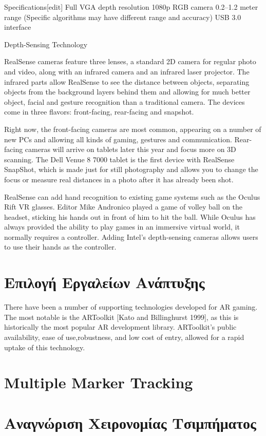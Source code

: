 Specifications[edit]
Full VGA depth resolution
1080p RGB camera
0.2–1.2 meter range (Specific algorithms may have different range and accuracy)
USB 3.0 interface


Depth-Sensing Technology

RealSense cameras feature three lenses, a standard 2D camera for regular photo and video, along with an infrared camera and an infrared laser projector. The infrared parts allow RealSense to see the distance between objects, separating objects from the background layers behind them and allowing for much better object, facial and gesture recognition than a traditional camera. The devices come in three flavors: front-facing, rear-facing and snapshot. 

Right now, the front-facing cameras are most common, appearing on a number of new PCs and allowing all kinds of gaming, gestures and communication. Rear-facing cameras will arrive on tablets later this year and focus more on 3D scanning. The Dell Venue 8 7000 tablet is the first device with RealSense SnapShot, which is made just for still photography and allows you to change the focus or measure real distances in a photo after it has already been shot.

RealSense can add hand recognition to existing game systems such as the Oculus Rift VR glasses. Editor Mike Andronico played a game of volley ball on the headset, sticking his hands out in front of him to hit the ball. While Oculus has always provided the ability to play games in an immersive virtual world, it normally requires a controller. Adding Intel's depth-sensing cameras allows users to use their hands as the controller.


\section{Επιλογή Εργαλείων Ανάπτυξης}

There have been a number of supporting technologies developed for AR gaming. The most notable is the ARToolkit [Kato and Billinghurst 1999], as this is historically the most popular AR development library. ARToolkit’s public availability, ease of use,robustness, and low cost of entry, allowed for a rapid uptake of this technology.


\section{Multiple Marker Tracking}
\section{Αναγνώριση Χειρονομίας Τσιμπήματος}

